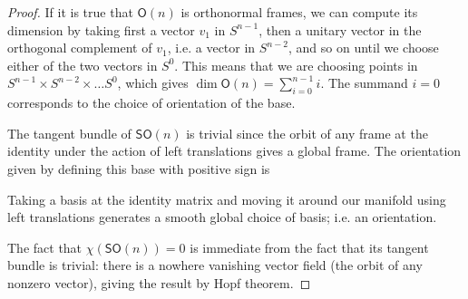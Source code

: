 \begin{proof}\leavevmode
	If it is true that \(\mathsf{O}(n)\) is orthonormal frames, we can compute its dimension by taking first a vector \(v_1\) in \(S^{n-1}\), then a unitary vector in the orthogonal complement of  \(v_1\), i.e. a vector in \(S^{n-2}\), and so on until we choose either of the two vectors in \(S^0\). This means that we are choosing points in \(S^{n-1}\times S^{n-2} \times \ldots S^0\), which gives \(\dim \mathsf{O}(n)=\sum_{i=0}^{n-1}i\). The summand \(i=0\) corresponds to the choice of orientation of the base.

	The tangent bundle of \(\mathsf{SO}(n)\) is trivial since the orbit of any frame at the identity under the action of left translations gives a global frame. The orientation given by defining this base with positive sign is 

	Taking a basis at the identity matrix and moving it around our manifold using left translations generates a smooth global choice of basis; i.e. an orientation.

	The fact that \(\chi(\mathsf{SO}(n))=0\) is immediate from the fact that its tangent bundle is trivial: there is a nowhere vanishing vector field (the orbit of any nonzero vector), giving the result by Hopf theorem.
\iffalse
	\(\mathsf{SL}(n)\) is \(\det^{-1}(1)\) for \(\det:\mathsf{GL}(n)\to \mathbb{R}\). And \(\mathsf{O}(n)\) is \(F^{-1}(\operatorname{Id})\) for \(F: \mathsf{GL}(n)\to \mathsf{GL}(n)\), \(A \mapsto  A A^{\mathbf{T}}\). And then \(\mathsf{SO}(n)=\mathsf{SL}(n)\cap \mathsf{O}(n)\).

To compute the dimension of \(\mathsf{SO}(n)\) consider the embedding \(\mathsf{O}(n)\hookrightarrow \mathsf{GL}(n)\). If \(\mathsf{O}(n)\pitchfork \mathsf{SL}(n)\) we get that \(\mathsf{SO}(n)\) has the same codimension inside \(\mathsf{O}(n)\) as the codimension of \(\mathsf{SL}(n)\) inside \(\mathsf{GL}(n)\), the latter being 1 since it is a level-set of a real valued function. {\color{2}But what is the dimension of \(\mathsf{O}(n)\)?}

To give \(\mathsf{SO}(n)\) an orientation we can use the preimage orientation. That is\fi






\end{proof}




